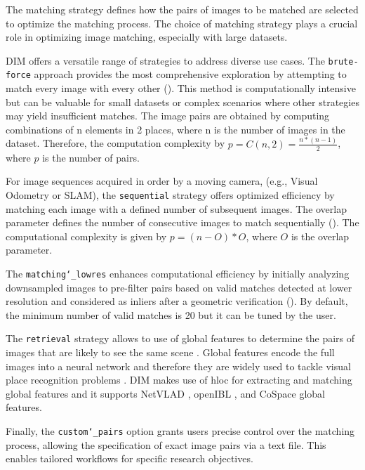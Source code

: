 The matching strategy defines how the pairs of images to be matched are selected to optimize the matching process. The choice of matching strategy plays a crucial role in optimizing image matching, especially with large datasets.  

DIM offers a versatile range of strategies to address diverse use cases. 
The \texttt{brute-force} approach provides the most comprehensive exploration by attempting to match every image with every other (). 
This method is computationally intensive but can be valuable for small datasets or complex scenarios where other strategies may yield insufficient matches. 
The image pairs are obtained by computing combinations of n elements in 2 places, where n is the number of images in the dataset. 
Therefore, the computation complexity by $ p = C(n,2) = \frac{n*\left(n-1\right)}{2}$, where $p$ is the number of pairs.

For image sequences acquired in order by a moving camera, (e.g., Visual Odometry or SLAM), the \texttt{sequential} strategy offers optimized efficiency by matching each image with a defined number of subsequent images. 
The overlap parameter defines the number of consecutive images to match sequentially ().
The computational complexity is given by $p = \left(n-O\right) * O $, where $O$ is the overlap parameter.

The \texttt{matching\char`_lowres} enhances computational efficiency by initially analyzing downsampled images to pre-filter pairs based on valid matches detected at lower resolution and considered as inliers after a geometric verification (). 
By default, the minimum number of valid matches is 20 but it can be tuned by the user. 

The \texttt{retrieval} strategy allows to use of global features to determine the pairs of images that are likely to see the same scene \citep{Yang2013_imageretrieval}. 
Global features encode the full images into a neural network and therefore they are widely used to tackle visual place recognition problems \citep{napoletano2017visual}. 
DIM makes use of hloc \citep{Sarlin_2019_hloc} for extracting and matching global features and it supports NetVLAD \citep{arandjelovic2016netvlad},  openIBL \citep{ge2020selfsupervising}, and CoSpace \citep{Hong_2019} global features.  

Finally, the \texttt{custom\char`_pairs} option grants users precise control over the matching process, allowing the specification of exact image pairs via a text file. 
This enables tailored workflows for specific research objectives. 

